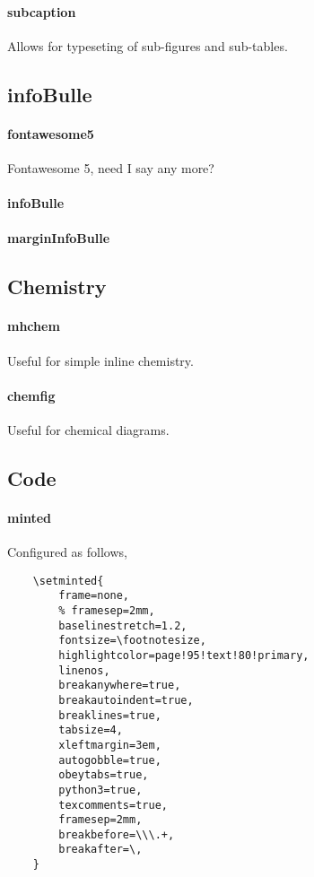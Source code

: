 \documentclass[solid,math,chem,code,plot]{bmc}
\begin{document}
\paragraph{\ttfamily subcaption}\label{par:subcaption}
Allows for typeseting of sub-figures and sub-tables.

\subsection{infoBulle}

\paragraph{\ttfamily fontawesome5}\label{par:fontawesome5}
Fontawesome 5, need I say any more?
\paragraph{\ttfamily infoBulle}\label{par:infoBulle}
\paragraph{\ttfamily marginInfoBulle}\label{par:marginInfoBulle}

\subsection{Chemistry}

\paragraph{\ttfamily mhchem}\label{par:mhchem}
Useful for simple inline chemistry.
\paragraph{\ttfamily chemfig}\label{par:chemfig}
Useful for chemical diagrams.

\subsection{Code}

\paragraph{\ttfamily minted}\label{par:minted}
Configured as follows,
\begin{verbatim}
    \setminted{
        frame=none,
        % framesep=2mm,
        baselinestretch=1.2,
        fontsize=\footnotesize,
        highlightcolor=page!95!text!80!primary,
        linenos,
        breakanywhere=true,
        breakautoindent=true,
        breaklines=true,
        tabsize=4,
        xleftmargin=3em,
        autogobble=true,
        obeytabs=true,
        python3=true,
        texcomments=true,
        framesep=2mm,
        breakbefore=\\\.+,
        breakafter=\,
    }
\end{verbatim}
\end{document}
